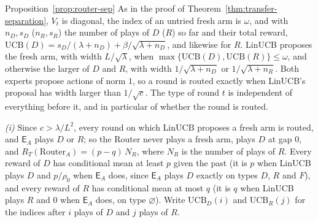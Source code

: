 \documentclass[anon]{alt2027} %
\newcommand{\Exp}{\mathsf{E}}
\begin{document}
\begin{proofof}{Proposition~\ref{prop:router-sep}}
As in the proof of Theorem~\ref{thm:transfer-separation}, $V_t$ is diagonal,
the index of an untried fresh arm is $\omega$, and with $n_D,s_D$ ($n_R,s_R$)
the number of plays of $D$ ($R$) so far and their total reward,
$\mathrm{UCB}(D)=s_D/(\lambda+n_D)+\beta/\sqrt{\lambda+n_D}$, and likewise for
$R$. LinUCB proposes the fresh arm, with width $L/\sqrt\lambda$, when
$\max\{\mathrm{UCB}(D),\mathrm{UCB}(R)\}\le\omega$, and otherwise the larger
of $D$ and $R$, with width $1/\sqrt{\lambda+n_D}$ or $1/\sqrt{\lambda+n_R}$.
Both experts propose actions of norm $1$, so a round is routed exactly when
LinUCB's proposal has width larger than $1/\sqrt c$. The type of round $t$ is
independent of everything before it, and in particular of whether the round
is routed.

\emph{(i)} Since $c>\lambda/L^2$, every round on which LinUCB proposes a fresh
arm is routed, and $\Exp_A$ plays $D$ or $R$; so the Router never plays a
fresh arm, plays $D$ at gap $0$, and $R_T(\mathrm{Router}_A)=(p-q)\,N_R$,
where $N_R$ is the number of plays of $R$. Every reward of $D$ has
conditional mean at least $p$ given the past (it is $p$ when LinUCB plays $D$
and $p/\rho_0$ when $\Exp_A$ does, since $\Exp_A$ plays $D$ exactly on types
$D$, $R$ and $F$), and every reward of $R$ has conditional mean at most $q$
(it is $q$ when LinUCB plays $R$ and $0$ when $\Exp_A$ does, on type
$\varnothing$). Write $\mathrm{UCB}_D(i)$ and $\mathrm{UCB}_R(j)$ for the
indices after $i$ plays of $D$ and $j$ plays of $R$.


\end{proofof}
\end{document}
